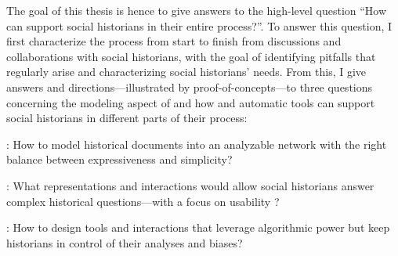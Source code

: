 The goal of this thesis is hence to give answers to the high-level question ``How can \va support social historians in their entire \hsna process?''.
To answer this question, I first characterize the \hsna process from start to finish from discussions and collaborations with social historians, with the goal of identifying pitfalls that regularly arise and characterizing social historians' needs.
From this, I give answers and directions---illustrated by proof-of-concepts---to three questions concerning the modeling aspect of \hsna and how \va and automatic tools can support social historians in different parts of their process:


\begin{description}
    \item \qone:  How to model historical documents into an analyzable network with the right balance between expressiveness and simplicity?
    \item \qtwo:  What representations and interactions would allow social historians answer complex historical questions---with a focus on usability ?
    \item \qthree: How to design \va tools and interactions that leverage algorithmic power but keep historians in control of their analyses and biases?
\end{description}

